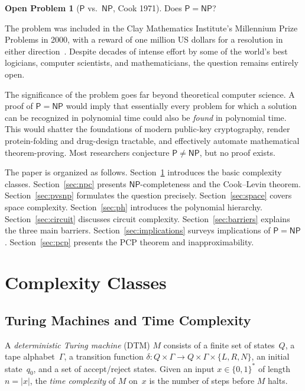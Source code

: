 \documentclass[12pt,a4paper]{amsart}
\theoremstyle{definition}
\newtheorem{openproblem}[theorem]{Open Problem}
\newcommand{\Pclass}{\mathsf{P}}
\newcommand{\NP}{\mathsf{NP}}
\begin{document}
\begin{openproblem}[$\Pclass$ vs.\ $\NP$, Cook 1971]
Does $\Pclass = \NP$?
\end{openproblem}

The problem was included in the Clay Mathematics Institute's Millennium Prize
Problems in 2000, with a reward of one million US dollars for a resolution in
either direction~\cite{smale1998}.  Despite decades of intense effort by some
of the world's best logicians, computer scientists, and mathematicians, the
question remains entirely open.

The significance of the problem goes far beyond theoretical computer science.
A proof of $\Pclass = \NP$ would imply that essentially every problem for which
a solution can be recognized in polynomial time could also be \emph{found} in
polynomial time.  This would shatter the foundations of modern public-key
cryptography, render protein-folding and drug-design tractable, and effectively
automate mathematical theorem-proving.  Most researchers conjecture
$\Pclass \neq \NP$, but no proof exists.

The paper is organized as follows.  Section~\ref{sec:complexity-classes}
introduces the basic complexity classes.  Section~\ref{sec:npc} presents
$\NP$-completeness and the Cook--Levin theorem.  Section~\ref{sec:pvsnp}
formulates the question precisely.  Section~\ref{sec:space} covers space
complexity.  Section~\ref{sec:ph} introduces the polynomial hierarchy.
Section~\ref{sec:circuit} discusses circuit complexity.
Section~\ref{sec:barriers} explains the three main barriers.
Section~\ref{sec:implications} surveys implications of $\Pclass = \NP$.
Section~\ref{sec:pcp} presents the PCP theorem and inapproximability.

\section{Complexity Classes}
\label{sec:complexity-classes}

\subsection{Turing Machines and Time Complexity}

A \emph{deterministic Turing machine} (DTM) $M$ consists of a finite set of
states~$Q$, a tape alphabet~$\Gamma$, a transition function
$\delta\colon Q\times\Gamma\to Q\times\Gamma\times\{L,R,N\}$, an initial
state~$q_0$, and a set of accept/reject states.  Given an input $x\in\{0,1\}^*$
of length $n=|x|$, the \emph{time complexity} of $M$ on~$x$ is the number of
steps before $M$ halts.
\end{document}
